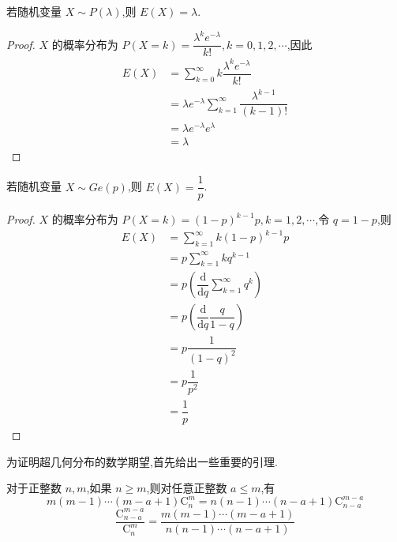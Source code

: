 \begin{conclusion}
    \indent 若随机变量 $X \sim P(\lambda)$,则 $E(X) = \lambda$.
\end{conclusion}

\begin{proof}
    $X$ 的概率分布为 $P(X=k) = \dfrac{\lambda^k e^{-\lambda}}{k!}, k=0,1,2,\cdots$,因此
    $$
    \begin{aligned}
        E(X) &= \sum_{k=0}^{\infty} k \dfrac{\lambda^k e^{-\lambda}}{k!} \\
        &= \lambda e^{-\lambda} \sum_{k=1}^{\infty} \dfrac{\lambda^{k-1}}{(k-1)!} \\
        &= \lambda e^{-\lambda} e^{\lambda} \\
        &= \lambda
    \end{aligned}
    $$
\end{proof}

\begin{conclusion}
    \indent 若随机变量 $X \sim Ge(p)$,则 $E(X) = \dfrac{1}{p}$.
\end{conclusion}

\begin{proof}
    $X$ 的概率分布为 $P(X=k) = (1-p)^{k-1} p, k=1,2,\cdots$,令 $q=1-p$,则
    $$
    \begin{aligned}
        E(X) &= \sum_{k=1}^{\infty} k (1-p)^{k-1} p \\
        &= p \sum_{k=1}^{\infty} k q^{k-1} \\
        &= p \left( \dfrac{\text{d}}{\text{d}q} \sum_{k=1}^{\infty} q^k \right) \\
        &= p \left( \dfrac{\text{d}}{\text{d}q} \dfrac{q}{1-q} \right) \\
        &= p \dfrac{1}{(1-q)^2} \\
        &= p \dfrac{1}{p^2} \\
        &= \dfrac{1}{p}
    \end{aligned}
    $$
\end{proof}

为证明超几何分布的数学期望,首先给出一些重要的引理.

\begin{lemma} \label{lemma:超几何分布1}
    \indent 对于正整数 $n,m$,如果 $n \geqslant m$,则对任意正整数 $a \leqslant m$,有
    \begin{equation} \label{equation:超几何分布1}
        m(m-1) \cdots (m-a+1) \mathrm{C}_n^m = n(n-1) \cdots (n-a+1) \mathrm{C}_{n-a}^{m-a}
    \end{equation}
    \begin{equation} \label{equation:超几何分布2}
        \dfrac{\mathrm{C}_{n-a}^{m-a}}{\mathrm{C}_n^m} = \dfrac{m(m-1) \cdots (m-a+1)}{n(n-1) \cdots (n-a+1)}
    \end{equation}
\end{lemma}

